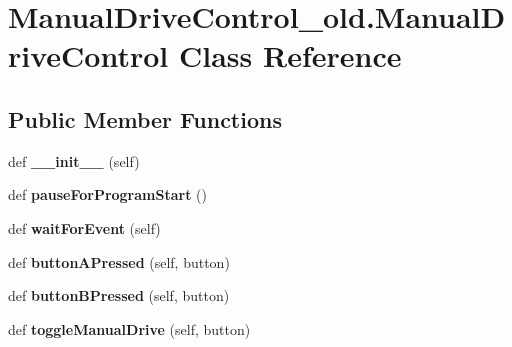 \hypertarget{classManualDriveControl__old_1_1ManualDriveControl}{}\section{Manual\+Drive\+Control\+\_\+old.\+Manual\+Drive\+Control Class Reference}
\label{classManualDriveControl__old_1_1ManualDriveControl}
\subsection*{Public Member Functions}
\begin{DoxyCompactItemize}
\item 
\mbox{\label{classManualDriveControl__old_1_1ManualDriveControl_a0be301cf15c597d60d8e0483f097cdb1}} 
def {\bfseries \+\_\+\+\_\+init\+\_\+\+\_\+} (self)
\item 
\mbox{\label{classManualDriveControl__old_1_1ManualDriveControl_a0380c77db181710196125a5e11f37886}} 
def {\bfseries pause\+For\+Program\+Start} ()
\item 
\mbox{\label{classManualDriveControl__old_1_1ManualDriveControl_a3bb7326bbbe0fdd40f1634146d20c2ea}} 
def {\bfseries wait\+For\+Event} (self)
\item 
\mbox{\label{classManualDriveControl__old_1_1ManualDriveControl_af58f1f6393f682e41b7e75807c98a212}} 
def {\bfseries button\+A\+Pressed} (self, button)
\item 
\mbox{\label{classManualDriveControl__old_1_1ManualDriveControl_a90d7916605fa033c89a5ffaa773c2223}} 
def {\bfseries button\+B\+Pressed} (self, button)
\item 
\mbox{\label{classManualDriveControl__old_1_1ManualDriveControl_a66fe6baad6ab3d7a02ef3b1a67a40b28}} 
def {\bfseries toggle\+Manual\+Drive} (self, button)
\item 
\mbox{\label{classManualDriveControl__old_1_1ManualDriveControl_a1592803ec1394e58873134ab6b9be1a1}} 

\end{DoxyCompactItemize}
